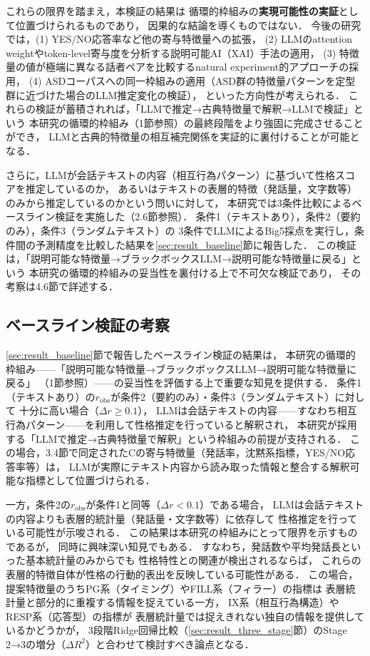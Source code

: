 \documentclass[dvipdfmx,11pt,a4paper]{bxjsarticle}
\begin{document}
これらの限界を踏まえ，本検証の結果は
循環的枠組みの\textbf{実現可能性の実証}として位置づけられるものであり，
因果的な結論を導くものではない．
今後の研究では，(1) YES/NO応答率など他の寄与特徴量への拡張，
(2) LLMのattention weightやtoken-level寄与度を分析する説明可能AI（XAI）手法の適用，
(3) 特徴量の値が極端に異なる話者ペアを比較するnatural experiment的アプローチの採用，
(4) ASDコーパスへの同一枠組みの適用（ASD群の特徴量パターンを定型群に近づけた場合のLLM推定変化の検証），
といった方向性が考えられる．
これらの検証が蓄積されれば，「LLMで推定→古典特徴量で解釈→LLMで検証」という
本研究の循環的枠組み（1節参照）の最終段階をより強固に完成させることができ，
LLMと古典的特徴量の相互補完関係を実証的に裏付けることが可能となる．

さらに，LLMが会話テキストの内容（相互行為パターン）に基づいて性格スコアを推定しているのか，
あるいはテキストの表層的特徴（発話量，文字数等）のみから推定しているのかという問いに対して，
本研究では3条件比較によるベースライン検証を実施した（2.6節参照）．
条件1（テキストあり），条件2（要約のみ），条件3（ランダムテキスト）の
3条件でLLMによるBig5採点を実行し，条件間の予測精度を比較した結果を\ref{sec:result_baseline}節に報告した．
この検証は，「説明可能な特徴量→ブラックボックスLLM→説明可能な特徴量に戻る」という
本研究の循環的枠組みの妥当性を裏付ける上で不可欠な検証であり，
その考察は4.6節で詳述する．

\subsection{ベースライン検証の考察}
\label{sec:discuss_baseline}


\ref{sec:result_baseline}節で報告したベースライン検証の結果は，
本研究の循環的枠組み——「説明可能な特徴量→ブラックボックスLLM→説明可能な特徴量に戻る」
（1節参照）——の妥当性を評価する上で重要な知見を提供する．
条件1（テキストあり）の$r_{\text{obs}}$が条件2（要約のみ）・条件3（ランダムテキスト）に対して
十分に高い場合（$\Delta r \geq 0.1$），
LLMは会話テキストの内容——すなわち相互行為パターン——を利用して性格推定を行っていると解釈され，
本研究が採用する「LLMで推定→古典特徴量で解釈」という枠組みの前提が支持される．
この場合，3.4節で同定されたCの寄与特徴量（発話率，沈黙系指標，YES/NO応答率等）は，
LLMが実際にテキスト内容から読み取った情報と整合する解釈可能な指標として位置づけられる．

一方，条件2の$r_{\text{obs}}$が条件1と同等（$\Delta r < 0.1$）である場合，
LLMは会話テキストの内容よりも表層的統計量（発話量・文字数等）に依存して
性格推定を行っている可能性が示唆される．
この結果は本研究の枠組みにとって限界を示すものであるが，
同時に興味深い知見でもある．
すなわち，発話数や平均発話長といった基本統計量のみからでも
性格特性との関連が検出されるならば，
これらの表層的特徴自体が性格の行動的表出を反映している可能性がある．
この場合，提案特徴量のうちPG系（タイミング）やFILL系（フィラー）の指標は
表層統計量と部分的に重複する情報を捉えている一方，
IX系（相互行為構造）やRESP系（応答型）の指標が
表層統計量では捉えきれない独自の情報を提供しているかどうかが，
3段階Ridge回帰比較（\ref{sec:result_three_stage}節）のStage 2→3の増分（$\Delta R^2$）と合わせて検討すべき論点となる．
\end{document}
